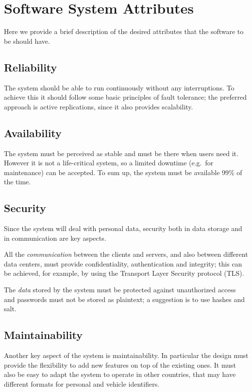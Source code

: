 \section{Software System Attributes}
Here we provide a brief description of the desired attributes that the software
to be should have.

\subsection{Reliability}
The system should be able to run continuously without any interruptions.
To achieve this it should follow some basic principles of fault tolerance;
the preferred approach is active replications, since it also provides
scalability.

\subsection{Availability}
The system must be perceived as stable and must be there when users need it.
However it is not a life-critical system, so a limited downtime (e.g.\ for
maintenance) can be accepted. To sum up, the system must be available 99\% of
the time.

\subsection{Security}
Since the system will deal with personal data, security both in data storage
and in communication are key aspects.

All the \emph{communication} between the clients and servers, and also between
different data centers, must provide confidentiality, authentication and
integrity; this can be achieved, for example, by using the Transport Layer
Security protocol (TLS).

The \emph{data} stored by the system must be protected against unauthorized
access and passwords must not be stored as plaintext; a suggestion is to use
hashes and salt.

\subsection{Maintainability}
Another key aspect of the system is maintainability. In particular the design
must provide the flexibility to add new features on top of the existing ones.
It must also be easy to adapt the system to operate in other countries,
that may have different formats for personal and vehicle identifiers.

